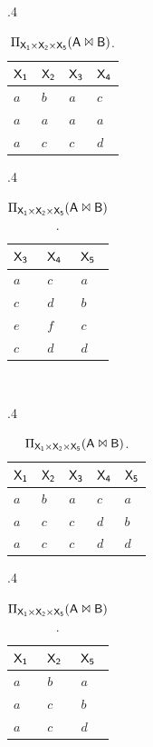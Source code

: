 \documentclass[11pt,final,hidelinks]{article}
\begin{document}
\begin{example}
\begin{table}[h]
\centering
\caption{Relations}
\begin{subtable}[h]{.4\linewidth}
\centering
\begin{tabular}{llll}
\toprule
$\Set{X}[1]$ & $\Set{X}[2]$ & $\Set{X}[3]$ & $\Set{X}[4]$\\
\midrule
$a$ & $b$ & $a$ & $c$\\
$a$ & $a$ & $a$ & $a$\\
$a$ & $c$ & $c$ & $d$\\
\bottomrule
\end{tabular}
\caption{$\Relation{A}$}
\label{tbl:ex_r1}
\end{subtable}
\begin{subtable}[h]{.4\linewidth}
\centering
\begin{tabular}{lll} 
\toprule
$\Set{X}[3]$ & $\Set{X}[4]$ & $\Set{X}[5]$\\
\midrule
$a$ & $c$ & $a$\\
$c$ & $d$ & $b$\\
$e$ & $f$ & $c$\\
$c$ & $d$ & $d$\\
\bottomrule
\end{tabular}
\caption{$\Relation{B}$}
\label{tbl:ex_r2}
\end{subtable}\\
\begin{subtable}[h]{.4\linewidth}
\centering
\begin{tabular}{lllll}
\toprule
$\Set{X}[1]$ & $\Set{X}[2]$ & $\Set{X}[3]$ & $\Set{X}[4]$ & $\Set{X}[5]$\\
\midrule
$a$ & $b$ & $a$ & $c$ & $a$\\
$a$ & $c$ & $c$ & $d$ & $b$\\
$a$ & $c$ & $c$ & $d$ & $d$\\
\bottomrule
\end{tabular}
\caption{$\Relation{A} \Join \Relation{B}$}
\label{tbl:ex_join}
\end{subtable}
\begin{subtable}[h]{.4\linewidth}
\centering
\begin{tabular}{lll}
\toprule
$\Set{X}[1]$ & $\Set{X}[2]$ & $\Set{X}[5]$\\
\midrule
$a$ & $b$ & $a$\\
$a$ & $c$ & $b$\\
$a$ & $c$ & $d$\\
\bottomrule
\end{tabular}
\caption{$\Proj_{\Set{X}[1] \times \Set{X}[2] \times \Set{X}[5]}(\Relation{A} \Join \Relation{B})$.}
\label{tbl:ex_proj}
\end{subtable}
\end{table}
\end{example}
\end{document}
